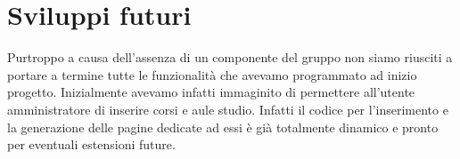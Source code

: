 \section{Sviluppi futuri}\label{sviluppi_futuri}
Purtroppo a causa dell'assenza di un componente del gruppo non siamo riusciti a portare a termine tutte le funzionalità che avevamo programmato ad inizio progetto. Inizialmente avevamo infatti immaginito di permettere all'utente amministratore di inserire corsi e aule studio. Infatti il codice per l'inserimento e la generazione delle pagine dedicate ad essi è già totalmente dinamico e pronto per eventuali estensioni future.
